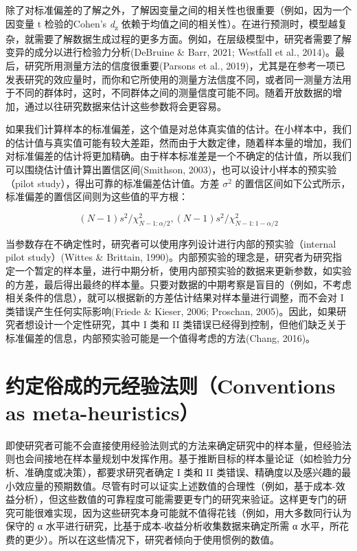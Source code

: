 \documentclass[
  letterpaper,
  DIV=11,
  numbers=noendperiod]{scrreprt}
\begin{document}
除了对标准偏差的了解之外，了解因变量之间的相关性也很重要（例如，因为一个因变量
t 检验的Cohen's \emph{d}\textsubscript{z}
依赖于均值之间的相关性）。在进行预测时，模型越复杂，就需要了解数据生成过程的更多方面。例如，在层级模型中，研究者需要了解变异的成分以进行检验力分析(DeBruine
\& Barr, 2021; Westfall et al.,
2014)。最后，研究所用测量方法的信度很重要(Parsons et al.,
2019)，尤其是在参考一项已发表研究的效应量时，而你和它所使用的测量方法信度不同，或者同一测量方法用于不同的群体时，这时，不同群体之间的测量信度可能不同。随着开放数据的增加，通过以往研究数据来估计这些参数将会更容易。

如果我们计算样本的标准偏差，这个值是对总体真实值的估计。在小样本中，我们的估计值与真实值可能有较大差距，然而由于大数定律，随着样本量的增加，我们对标准偏差的估计将更加精确。由于样本标准差是一个不确定的估计值，所以我们可以围绕估计值计算出置信区间(Smithson,
2003)，也可以设计小样本的预实验（pilot
study），得出可靠的标准偏差估计值。方差 \(\sigma^2\)
的置信区间如下公式所示，标准偏差的置信区间则为这些值的平方根：

\[(N - 1)s^2/\chi^2_{N-1:\alpha/2},(N - 1)s^2/\chi^2_{N-1:1-\alpha/2}\]

当参数存在不确定性时，研究者可以使用序列设计进行内部的预实验（internal
pilot study）(Wittes \& Brittain,
1990)。内部预实验的理念是，研究者为研究指定一个暂定的样本量，进行中期分析，使用内部预实验的数据来更新参数，如实验的方差，最后得出最终的样本量。只要对数据的中期考察是盲目的（例如，不考虑相关条件的信息），就可以根据新的方差估计结果对样本量进行调整，而不会对
I 类错误产生任何实际影响(Friede \& Kieser, 2006; Proschan,
2005)。因此，如果研究者想设计一个定性研究，其中 I 类和 II
类错误已经得到控制，但他们缺乏关于标准偏差的信息，内部预实验可能是一个值得考虑的方法(Chang,
2016)。

\hypertarget{ux7ea6ux5b9aux4fd7ux6210ux7684ux5143ux7ecfux9a8cux6cd5ux5219conventions-as-meta-heuristics}{%
\section{约定俗成的元经验法则（Conventions as
meta-heuristics）}\label{ux7ea6ux5b9aux4fd7ux6210ux7684ux5143ux7ecfux9a8cux6cd5ux5219conventions-as-meta-heuristics}}

即使研究者可能不会直接使用经验法则式的方法来确定研究中的样本量，但经验法则也会间接地在样本量规划中发挥作用。基于推断目标的样本量论证（如检验力分析、准确度或决策），都要求研究者确定
I 类和 II
类错误、精确度以及感兴趣的最小效应量的预期数值。尽管有时可以证实上述数值的合理性（例如，基于成本-效益分析），但这些数值的可靠程度可能需要更专门的研究来验证。这样更专门的研究可能很难实现，因为这些研究本身可能就不值得花钱（例如，用大多数同行认为保守的
α 水平进行研究，比基于成本-收益分析收集数据来确定所需 α
水平，所花费的更少）。所以在这些情况下，研究者倾向于使用惯例的数值。
\end{document}
